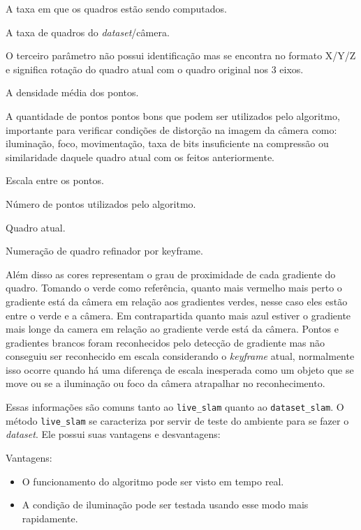 \begin{description}
	\item[Map upd :]{A taxa em que os quadros estão sendo computados.}
	\item[Trk :]{A taxa de quadros do \textit{dataset}/câmera.}
	\item[X/Y/Z :]{O terceiro parâmetro não possui identificação mas se encontra no formato X/Y/Z e significa rotação do quadro atual com o quadro original nos 3 eixos.}
	\item[Dens X\% :]{A densidade média dos pontos.}
	\item[Good X\% :]{ A quantidade de pontos pontos bons que podem ser utilizados pelo algoritmo, importante para verificar condições de distorção na imagem da câmera como: iluminação, foco, movimentação, taxa de bits insuficiente na compressão ou similaridade daquele quadro atual com os feitos anteriormente.}
	\item[Scale X\% :]{Escala entre os pontos.}
	\item{Número de pontos utilizados pelo algoritmo.}
	\item{Quadro atual.}
	\item{Numeração de quadro refinador por keyframe.}
\end{description}

Além disso as cores representam o grau de proximidade de cada gradiente do quadro. Tomando o verde como referência, quanto mais vermelho mais perto o gradiente está da câmera em relação aos gradientes verdes, nesse caso eles estão entre o verde e a câmera. Em contrapartida quanto mais azul estiver o gradiente mais longe da camera em relação ao gradiente verde está da câmera. Pontos e gradientes brancos foram reconhecidos pelo detecção de gradiente mas não conseguiu ser reconhecido em escala considerando o \textit{keyframe} atual, normalmente isso ocorre quando há uma diferença de escala inesperada como um objeto que se move ou se a iluminação ou foco da câmera atrapalhar no reconhecimento.

Essas informações são comuns tanto ao \texttt{live\_slam} quanto ao \texttt{dataset\_slam}. O método \texttt{live\_slam} se caracteriza por servir de teste do ambiente para se fazer o \textit{dataset}. Ele possui suas vantagens e desvantagens:

Vantagens:

\begin{itemize}
	\item{O funcionamento do algoritmo pode ser visto em tempo real.}
	\item{A condição de iluminação pode ser testada usando esse modo mais rapidamente.}
\end{itemize}


